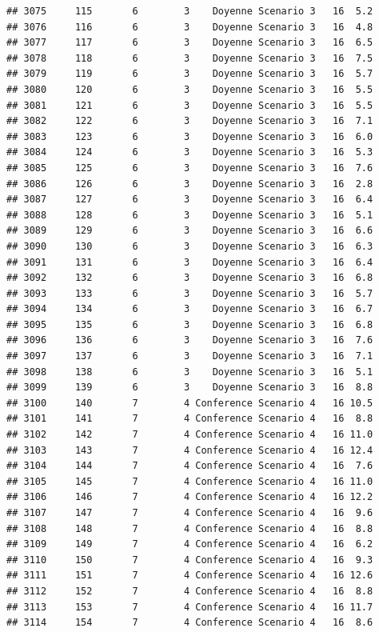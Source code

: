\documentclass[
]{article}
\begin{document}
\begin{verbatim}
## 3075     115       6        3    Doyenne Scenario 3   16  5.2
## 3076     116       6        3    Doyenne Scenario 3   16  4.8
## 3077     117       6        3    Doyenne Scenario 3   16  6.5
## 3078     118       6        3    Doyenne Scenario 3   16  7.5
## 3079     119       6        3    Doyenne Scenario 3   16  5.7
## 3080     120       6        3    Doyenne Scenario 3   16  5.5
## 3081     121       6        3    Doyenne Scenario 3   16  5.5
## 3082     122       6        3    Doyenne Scenario 3   16  7.1
## 3083     123       6        3    Doyenne Scenario 3   16  6.0
## 3084     124       6        3    Doyenne Scenario 3   16  5.3
## 3085     125       6        3    Doyenne Scenario 3   16  7.6
## 3086     126       6        3    Doyenne Scenario 3   16  2.8
## 3087     127       6        3    Doyenne Scenario 3   16  6.4
## 3088     128       6        3    Doyenne Scenario 3   16  5.1
## 3089     129       6        3    Doyenne Scenario 3   16  6.6
## 3090     130       6        3    Doyenne Scenario 3   16  6.3
## 3091     131       6        3    Doyenne Scenario 3   16  6.4
## 3092     132       6        3    Doyenne Scenario 3   16  6.8
## 3093     133       6        3    Doyenne Scenario 3   16  5.7
## 3094     134       6        3    Doyenne Scenario 3   16  6.7
## 3095     135       6        3    Doyenne Scenario 3   16  6.8
## 3096     136       6        3    Doyenne Scenario 3   16  7.6
## 3097     137       6        3    Doyenne Scenario 3   16  7.1
## 3098     138       6        3    Doyenne Scenario 3   16  5.1
## 3099     139       6        3    Doyenne Scenario 3   16  8.8
## 3100     140       7        4 Conference Scenario 4   16 10.5
## 3101     141       7        4 Conference Scenario 4   16  8.8
## 3102     142       7        4 Conference Scenario 4   16 11.0
## 3103     143       7        4 Conference Scenario 4   16 12.4
## 3104     144       7        4 Conference Scenario 4   16  7.6
## 3105     145       7        4 Conference Scenario 4   16 11.0
## 3106     146       7        4 Conference Scenario 4   16 12.2
## 3107     147       7        4 Conference Scenario 4   16  9.6
## 3108     148       7        4 Conference Scenario 4   16  8.8
## 3109     149       7        4 Conference Scenario 4   16  6.2
## 3110     150       7        4 Conference Scenario 4   16  9.3
## 3111     151       7        4 Conference Scenario 4   16 12.6
## 3112     152       7        4 Conference Scenario 4   16  8.8
## 3113     153       7        4 Conference Scenario 4   16 11.7
## 3114     154       7        4 Conference Scenario 4   16  8.6

\end{verbatim}
\end{document}
